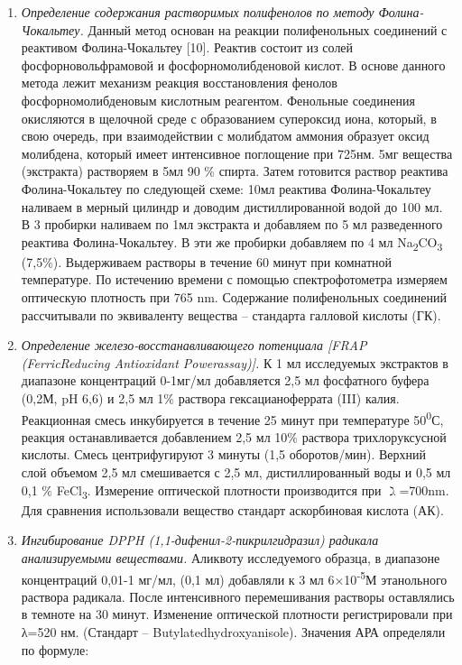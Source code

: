 \begin{enumerate}
\def\labelenumi{\arabic{enumi}.}
\item
  \emph{Определение содержания растворимых полифенолов по методу
  Фолина-Чокальтеу.} Данный метод основан на реакции полифенольных
  соединений с реактивом Фолина-Чокальтеу {[}10{]}. Реактив состоит из
  солей фосфорновольфрамовой и фосфорномолибденовой кислот. В основе
  данного метода лежит механизм реакция восстановления фенолов
  фосфорномолибденовым кислотным реагентом. Фенольные соединения
  окисляются в щелочной среде с образованием супероксид иона, который, в
  свою очередь, при взаимодействии с молибдатом аммония образует оксид
  молибдена, который имеет интенсивное поглощение при 725нм. 5мг
  вещества (экстракта) растворяем в 5мл 90 \% спирта. Затем готовится
  раствор реактива Фолина-Чокальтеу по следующей схеме: 10мл реактива
  Фолина-Чокальтеу наливаем в мерный цилиндр и доводим дистиллированной
  водой до 100 мл. В 3 пробирки наливаем по 1мл экстракта и добавляем по
  5 мл разведенного реактива Фолина-Чокальтеу. В эти же пробирки
  добавляем по 4 мл Na\textsubscript{2}CO\textsubscript{3} (7,5\%).
  Выдерживаем растворы в течение 60 минут при комнатной температуре. По
  истечению времени с помощью спектрофотометра измеряем оптическую
  плотность при 765 nm. Содержание полифенольных соединений рассчитывали
  по эквиваленту вещества -- стандарта галловой кислоты (ГК).
\item
  \emph{Определение железо-восстанавливающего потенциала {[}FRAP
  (FerricReducing Antioxidant Powerassay){]}.} К 1 мл исследуемых
  экстрактов в диапазоне концентраций 0-1мг/мл добавляется 2,5 мл
  фосфатного буфера (0,2М, pH 6,6) и 2,5 мл 1\(\%\) раствора
  гексацианоферрата (III) калия. Реакционная смесь инкубируется в
  течение 25 минут при температуре 50\textsuperscript{0}С, реакция
  останавливается добавлением 2,5 мл 10\(\%\) раствора трихлоруксусной
  кислоты. Смесь центрифугируют 3 минуты (1,5 оборотов/мин). Верхний
  слой объемом 2,5 мл смешивается с 2,5 мл, дистиллированный воды и 0,5
  мл 0,1 \(\%\) FeCl\textsubscript{3}. Измерение оптической плотности
  производится при \(\gimel\)=700nm. Для сравнения использовали вещество
  стандарт аскорбиновая кислота (АК).
\item
  \emph{Ингибирование DPPH (1,1-дифенил-2-пикрилгидразил) радикала
  анализируемыми веществами.} Аликвоту исследуемого образца, в диапазоне
  концентраций 0,01-1 мг/мл, (0,1 мл) добавляли к 3 мл
  6×10\textsuperscript{-5}М этанольного раствора радикала. После
  интенсивного перемешивания растворы оставлялись в темноте на 30 минут.
  Изменение оптической плотности регистрировали при λ=520 нм. (Стандарт
  -- Butylatedhydroxyanisole). Значения АРА определяли по формуле:
\end{enumerate}

